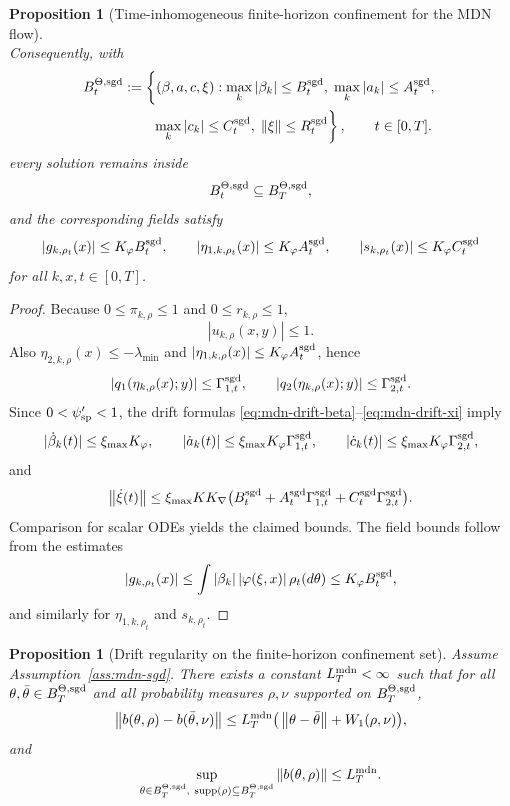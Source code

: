 \documentclass[11pt]{article}
\newtheorem{proposition}[theorem]{Proposition}
\theoremstyle{definition}
\newcommand{\supp}{\mathrm{supp}}
\newcommand{\norm}[1]{\left\lVert #1 \right\rVert}
\begin{document}
\begin{proposition}[Time-inhomogeneous finite-horizon confinement for the MDN flow]
\[\]
Consequently, with
\[
  \begin{aligned}
    B_t^{\Theta,\rm sgd}
    &:=
    \left\{
      (\beta,a,c,\xi):
      \max_k|\beta_k|\le B_t^{\rm sgd},\;
      \max_k|a_k|\le A_t^{\rm sgd},
    \right.
    \\
    &\qquad\left.
      \max_k|c_k|\le C_t^{\rm sgd},\;
      \norm{\xi}\le R_t^{\rm sgd}
    \right\},
    \qquad t\in[0,T].
  \end{aligned}
\]
every solution remains inside
\[
  B_t^{\Theta,\rm sgd}\subseteq B_T^{\Theta,\rm sgd},
\]
and the corresponding fields satisfy
\[
  |g_{k,\rho_t}(x)|\le K_\varphi B_t^{\rm sgd},
  \qquad
  |\eta_{1,k,\rho_t}(x)|\le K_\varphi A_t^{\rm sgd},
  \qquad
  |s_{k,\rho_t}(x)|\le K_\varphi C_t^{\rm sgd}
\]
for all $k,x,t\in[0,T]$.
\end{proposition}

\begin{proof}
Because $0\le \pi_{k,\rho}\le 1$ and $0\le r_{k,\rho}\le 1$,
\[
  |u_{k,\rho}(x,y)|\le 1.
\]
Also $\eta_{2,k,\rho}(x)\le -\lambda_{\min}$ and
$|\eta_{1,k,\rho}(x)|\le K_\varphi A_t^{\rm sgd}$, hence
\[
  |q_1(\eta_{k,\rho}(x);y)|\le \Gamma_{1,t}^{\rm sgd},
  \qquad
  |q_2(\eta_{k,\rho}(x);y)|\le \Gamma_{2,t}^{\rm sgd}.
\]
Since $0<\psi_{\rm sp}'<1$, the drift formulas
\eqref{eq:mdn-drift-beta}--\eqref{eq:mdn-drift-xi} imply
\[
  |\dot\beta_k(t)|\le \xi_{\max}K_\varphi,
  \qquad
  |\dot a_k(t)|\le \xi_{\max}K_\varphi\Gamma_{1,t}^{\rm sgd},
  \qquad
  |\dot c_k(t)|\le \xi_{\max}K_\varphi\Gamma_{2,t}^{\rm sgd},
\]
and
\[
  \norm{\dot\xi(t)}
  \le
  \xi_{\max}K K_\nabla
  \big(
    B_t^{\rm sgd}
    +
    A_t^{\rm sgd}\Gamma_{1,t}^{\rm sgd}
    +
    C_t^{\rm sgd}\Gamma_{2,t}^{\rm sgd}
  \big).
\]
Comparison for scalar ODEs yields the claimed bounds. The field bounds follow
from the estimates
\[
  |g_{k,\rho_t}(x)|
  \le
  \int |\beta_k|\,|\varphi(\xi,x)|\,\rho_t(d\theta)
  \le
  K_\varphi B_t^{\rm sgd},
\]
and similarly for $\eta_{1,k,\rho_t}$ and $s_{k,\rho_t}$.
\end{proof}

\begin{proposition}[Drift regularity on the finite-horizon confinement set]
\label{prop:mdn-drift-regularity}
Assume Assumption~\ref{ass:mdn-sgd}. There exists a constant
$L_T^{\rm mdn}<\infty$ such that for all
$\theta,\bar\theta\in B_T^{\Theta,\rm sgd}$ and all probability measures
$\rho,\nu$ supported on $B_T^{\Theta,\rm sgd}$,
\begin{equation}
  \norm{b(\theta,\rho)-b(\bar\theta,\nu)}
  \le
  L_T^{\rm mdn}\big(\norm{\theta-\bar\theta}+W_1(\rho,\nu)\big),
  \label{eq:mdn-drift-lipschitz}
\end{equation}
and
\[
  \sup_{\theta\in B_T^{\Theta,\rm sgd},\ \supp(\rho)\subseteq B_T^{\Theta,\rm sgd}}
  \norm{b(\theta,\rho)}
  \le
  L_T^{\rm mdn}.
\]
\end{proposition}
\end{document}
